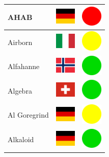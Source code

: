 \documentclass[12pt, a4paper, twoside]{report}
\begin{document}
\begin{center}
\begin{longtable}{|p{5cm}|p{2cm}|p{2cm}|}
 AHAB                                                       & \includegraphics[width=1cm]{../img/flags/de} &   \includegraphics[width=1cm]{../likes/n} \\ \hline
 Airborn                                                    & \includegraphics[width=1cm]{../img/flags/it} &   \includegraphics[width=1cm]{../likes/m} \\ \hline
 Alfahanne                                                  & \includegraphics[width=1cm]{../img/flags/no} &   \includegraphics[width=1cm]{../likes/y} \\ \hline
 Algebra                                                    & \includegraphics[width=1cm]{../img/flags/ch} &   \includegraphics[width=1cm]{../likes/y} \\ \hline
 Al Goregrind                                               & \includegraphics[width=1cm]{../img/flags/de} &   \includegraphics[width=1cm]{../likes/m} \\ \hline
 Alkaloid                                                   & \includegraphics[width=1cm]{../img/flags/de} &   \includegraphics[width=1cm]{../likes/y} \\ \hline

\end{longtable}
\end{center}
\end{document}
